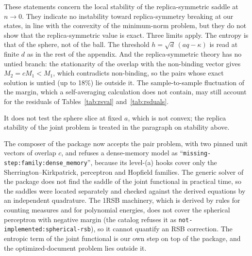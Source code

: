 These statements concern the local stability of the replica-symmetric saddle at $n\to0$. They indicate no instability toward replica-symmetry breaking at our states, in line with the convexity of the minimum-norm problem, but they do not show that the replica-symmetric value is exact. Three limits apply. The entropy is that of the sphere, not of the ball. The threshold $h=\sqrt d\,(aq-\kappa)$ is read at finite $d$ as in the rest of the appendix. And the replica-symmetric theory has no untied branch: the stationarity of the overlap with the non-binding vector gives $M_2=cM_1<M_1$, which contradicts non-binding, so the pairs whose exact solution is untied (up to 18\%) lie outside it. The sample-to-sample fluctuation of the margin, which a self-averaging calculation does not contain, may still account for the residuals of Tables~\ref{tab:rsval} and~\ref{tab:rsduals}.

It does not test the sphere slice at fixed $a$, which is not convex; the replica stability of the joint problem is treated in the paragraph on stability above.

The composer of the package now accepts the pair problem, with two pinned unit vectors of overlap $c$, and refuses a dense-memory model as ``\texttt{missing-step:family:dense\_memory}'', because its level-(a) hooks cover only the Sherrington--Kirkpatrick, perceptron and Hopfield families. The generic solver of the package does not find the saddle of the joint functional in practical time, so the saddles were located separately and checked against the derived equations by an independent quadrature. The 1RSB machinery, which is derived by rules for counting measures and for polynomial energies, does not cover the spherical perceptron with negative margin (the catalog refuses it as \texttt{not-implemented:spherical-rsb}), so it cannot quantify an RSB correction. The entropic term of the joint functional is our own step on top of the package, and the optimized-document problem lies outside it.
